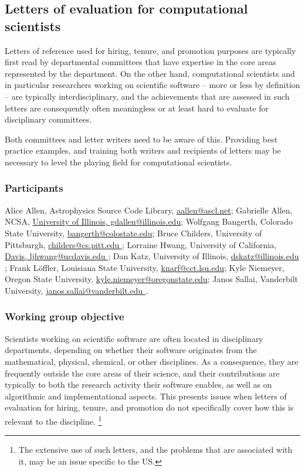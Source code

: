 \subsection{Letters of evaluation for computational scientists}
\label{sec:letters}


Letters of reference used for hiring, tenure, and promotion purposes
are typically first read by departmental committees that have
expertise in the core areas represented by the department. On the
other hand, computational scientists and in particular researchers
working on scientific software -- more or less by definition --
are typically interdisciplinary, and the achievements that are
assessed in such letters are consequently often meaningless or at
least hard to evaluate for disciplinary committees.

Both committees and letter writers need to be aware of this. Providing
best practice examples, and training both writers and recipients of
letters may be necessary to level the playing field for computational
scientists.

\subsubsection{Participants}

Alice Allen, Astrophysics Source Code Library, \url{aallen@ascl.net};
Gabrielle Allen, NCSA, \url{University of Illinois, gdallen@illinois.edu};
Wolfgang Bangerth, Colorado State University, \url{bangerth@colostate.edu};
Bruce Childers, University of Pittsburgh, \url{childers@cs.pitt.edu };
Lorraine Hwang, University of California, \url{Davis, ljhwang@ucdavis.edu };
Dan Katz, University of Illinois, \url{dskatz@illinois.edu };
Frank L{\"o}ffler, Louisiana State University, \url{knarf@cct.lsu.edu};
Kyle Niemeyer, Oregon State University, \url{kyle.niemeyer@oregonstate.edu};
Janos Sallai, Vanderbilt University, \url{janos.sallai@vanderbilt.edu }.

\subsubsection{Working group objective}

Scientists working on scientific software are often located in
disciplinary departments, depending on whether their software
originates from the mathematical, physical, chemical, or other
disciplines. As a consequence, they are frequently outside the core
areas of their science, and their contributions are typically to both
the research activity their software enables, as well as on
algorithmic and implementational aspects. This presents issues when
letters of evaluation for hiring, tenure, and promotion do not specifically
cover how this is relevant to the discipline.%
\footnote{The extensive use of such letters, and the problems that are
  associated with it, may be an issue specific to the US.}

